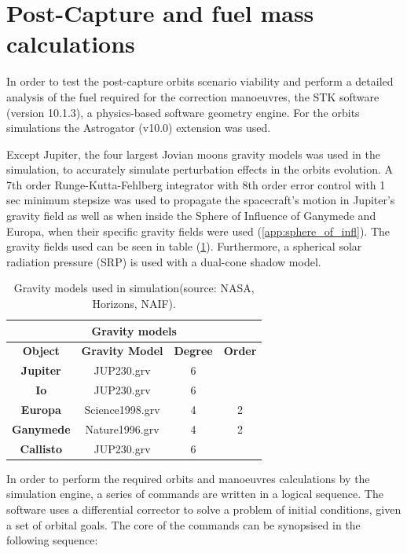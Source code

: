 \section{Post-Capture and fuel mass calculations}
In order to test the post-capture orbits scenario viability and perform a detailed analysis of the fuel required for the correction manoeuvres, the STK software (version 10.1.3), a physics-based software geometry engine. For the orbits simulations the Astrogator (v10.0) extension was used. 

Except Jupiter, the four largest Jovian moons gravity models was used in the simulation, to accurately simulate perturbation effects in the orbits evolution. A 7th order Runge-Kutta-Fehlberg integrator with 8th order error control with 1 sec minimum stepsize was used to propagate the spacecraft's motion in Jupiter's gravity field as well as when inside the Sphere of Influence of Ganymede and Europa, when their specific gravity fields were used (\ref{app:sphere_of_infl}). The gravity fields used can be seen in table (\ref{tab:gravf}). Furthermore, a spherical solar radiation pressure (SRP) is used with a dual-cone shadow model.

\begin{table}[htb!]
  \centering
    \begin{tabular}{|c|c|c|c|}
    \hline
    \multicolumn{4}{|c|}{\textbf{Gravity models}} \bigstrut\\
    \hline
    \textbf{Object} & \textbf{Gravity Model} & \textbf{Degree} & \textbf{Order} \bigstrut\\
    \hline
    \textbf{Jupiter} & JUP230.grv & 6     &  \bigstrut\\
    \hline
    \textbf{Io} & JUP230.grv & 6     &  \bigstrut\\
    \hline
    \textbf{Europa} & Science1998.grv & 4     & 2 \bigstrut\\
    \hline
    \textbf{Ganymede} & Nature1996.grv & 4     & 2 \bigstrut\\
    \hline
    \textbf{Callisto} & JUP230.grv & 6     &  \bigstrut\\
    \hline
    \end{tabular}%
    \caption{Gravity models used in simulation(source: NASA, Horizons, NAIF).\cite{Gravm}}\label{tab:gravf}
\end{table}%

In order to perform the required orbits and manoeuvres calculations by the simulation engine, a series of commands are written in a logical sequence. The software uses a differential corrector to solve a problem of initial conditions, given a set of orbital goals. 
The core of the commands can be synopsised in the following sequence:

